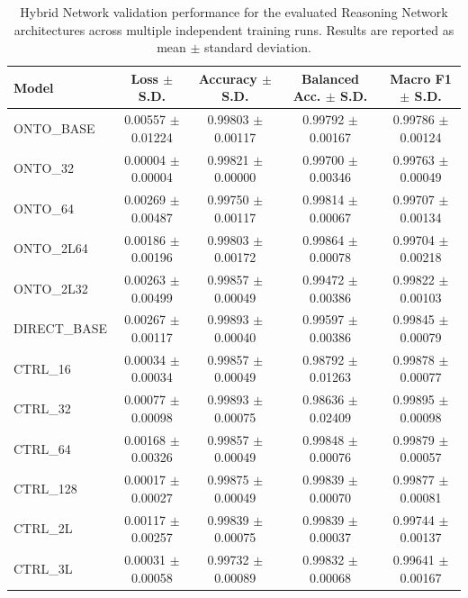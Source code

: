 \begin{table}[t]
\centering
\begin{tabular}{l c c c c}
\toprule
Model & Loss $\pm$ S.D. & Accuracy $\pm$ S.D. & Balanced Acc. $\pm$ S.D. & Macro F1 $\pm$ S.D. \\
\midrule
ONTO_BASE & 0.00557 $\pm$ 0.01224 & 0.99803 $\pm$ 0.00117 & 0.99792 $\pm$ 0.00167 & 0.99786 $\pm$ 0.00124 \\
ONTO_32 & 0.00004 $\pm$ 0.00004 & 0.99821 $\pm$ 0.00000 & 0.99700 $\pm$ 0.00346 & 0.99763 $\pm$ 0.00049 \\
ONTO_64 & 0.00269 $\pm$ 0.00487 & 0.99750 $\pm$ 0.00117 & 0.99814 $\pm$ 0.00067 & 0.99707 $\pm$ 0.00134 \\
ONTO_2L64 & 0.00186 $\pm$ 0.00196 & 0.99803 $\pm$ 0.00172 & 0.99864 $\pm$ 0.00078 & 0.99704 $\pm$ 0.00218 \\
ONTO_2L32 & 0.00263 $\pm$ 0.00499 & 0.99857 $\pm$ 0.00049 & 0.99472 $\pm$ 0.00386 & 0.99822 $\pm$ 0.00103 \\
DIRECT_BASE & 0.00267 $\pm$ 0.00117 & 0.99893 $\pm$ 0.00040 & 0.99597 $\pm$ 0.00386 & 0.99845 $\pm$ 0.00079 \\
CTRL_16 & 0.00034 $\pm$ 0.00034 & 0.99857 $\pm$ 0.00049 & 0.98792 $\pm$ 0.01263 & 0.99878 $\pm$ 0.00077 \\
CTRL_32 & 0.00077 $\pm$ 0.00098 & 0.99893 $\pm$ 0.00075 & 0.98636 $\pm$ 0.02409 & 0.99895 $\pm$ 0.00098 \\
CTRL_64 & 0.00168 $\pm$ 0.00326 & 0.99857 $\pm$ 0.00049 & 0.99848 $\pm$ 0.00076 & 0.99879 $\pm$ 0.00057 \\
CTRL_128 & 0.00017 $\pm$ 0.00027 & 0.99875 $\pm$ 0.00049 & 0.99839 $\pm$ 0.00070 & 0.99877 $\pm$ 0.00081 \\
CTRL_2L & 0.00117 $\pm$ 0.00257 & 0.99839 $\pm$ 0.00075 & 0.99839 $\pm$ 0.00037 & 0.99744 $\pm$ 0.00137 \\
CTRL_3L & 0.00031 $\pm$ 0.00058 & 0.99732 $\pm$ 0.00089 & 0.99832 $\pm$ 0.00068 & 0.99641 $\pm$ 0.00167 \\
\bottomrule
\end{tabular}
\caption{Hybrid Network validation performance for the evaluated Reasoning Network architectures across multiple independent training runs. Results are reported as mean $\pm$ standard deviation.}
\label{tab:rn_architecture_hn}
\end{table}